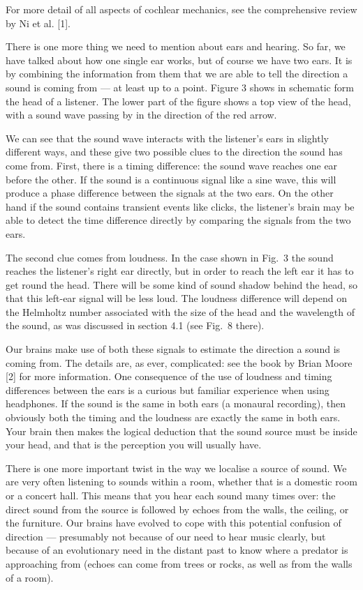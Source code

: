   For more detail of all aspects of cochlear mechanics, see the comprehensive 
  review by Ni et al. [1]. 

  There is one more thing we need to mention about ears and hearing. So far, we 
  have talked about how one single ear works, but of course we have two ears. 
  It is by combining the information from them that we are able to tell the 
  direction a sound is coming from — at least up to a point. Figure 3 shows in 
  schematic form the head of a listener. The lower part of the figure shows a 
  top view of the head, with a sound wave passing by in the direction of the 
  red arrow. 

  We can see that the sound wave interacts with the listener’s ears in slightly 
  different ways, and these give two possible clues to the direction the sound 
  has come from. First, there is a timing difference: the sound wave reaches 
  one ear before the other. If the sound is a continuous signal like a sine 
  wave, this will produce a phase difference between the signals at the two 
  ears. On the other hand if the sound contains transient events like clicks, 
  the listener’s brain may be able to detect the time difference directly by 
  comparing the signals from the two ears. 

  The second clue comes from loudness. In the case shown in Fig.\ 3 the sound 
  reaches the listener’s right ear directly, but in order to reach the left ear 
  it has to get round the head. There will be some kind of sound shadow behind 
  the head, so that this left-ear signal will be less loud. The loudness 
  difference will depend on the Helmholtz number associated with the size of 
  the head and the wavelength of the sound, as was discussed in section 4.1 
  (see Fig.\ 8 there). 

  Our brains make use of both these signals to estimate the direction a sound 
  is coming from. The details are, as ever, complicated: see the book by Brian 
  Moore [2] for more information. One consequence of the use of loudness and 
  timing differences between the ears is a curious but familiar experience when 
  using headphones. If the sound is the same in both ears (a monaural 
  recording), then obviously both the timing and the loudness are exactly the 
  same in both ears. Your brain then makes the logical deduction that the sound 
  source must be inside your head, and that is the perception you will usually 
  have. 

  There is one more important twist in the way we localise a source of sound. 
  We are very often listening to sounds within a room, whether that is a 
  domestic room or a concert hall. This means that you hear each sound many 
  times over: the direct sound from the source is followed by echoes from the 
  walls, the ceiling, or the furniture. Our brains have evolved to cope with 
  this potential confusion of direction — presumably not because of our need to 
  hear music clearly, but because of an evolutionary need in the distant past 
  to know where a predator is approaching from (echoes can come from trees or 
  rocks, as well as from the walls of a room). 

